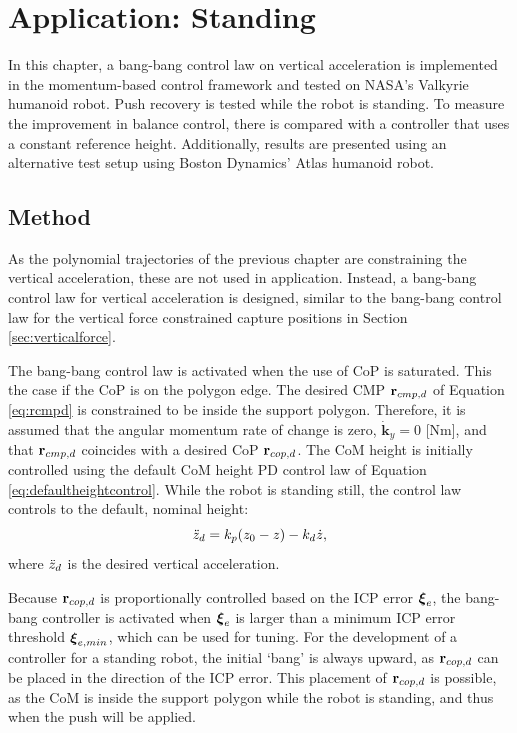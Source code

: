 \chapter{Application: Standing}\label{chap:standing}
In this chapter, a bang-bang control law on vertical acceleration is implemented in the momentum-based control framework and tested on NASA's Valkyrie \cite{radford2015valkyrie} humanoid robot. Push recovery is tested while the robot is standing. To measure the improvement in balance control, there is compared with a controller that uses a constant reference height. Additionally, results are presented using an alternative test setup using Boston Dynamics' Atlas humanoid robot.

\section{Method}
As the polynomial trajectories of the previous chapter are constraining the vertical acceleration, these are not used in application. Instead, a bang-bang control law for vertical acceleration is designed, similar to the bang-bang control law for the vertical force constrained capture positions in Section \ref{sec:verticalforce}.

The bang-bang control law is activated when the use of \ac{CoP} is saturated. This the case if the \ac{CoP} is on the polygon edge. The desired \ac{CMP} $\mathbf{r}_{cmp,d}$ of Equation \eqref{eq:rcmpd} is constrained to be inside the support polygon. Therefore, it is assumed that the angular momentum rate of change is zero, $\dot{\mathbf{k}}_y=0$ [Nm], and that $\mathbf{r}_{cmp,d}$ coincides with a desired \ac{CoP} $\mathbf{r}_{cop,d}$. The \ac{CoM} height is initially controlled using the default \ac{CoM} height PD control law of Equation \eqref{eq:defaultheightcontrol}.  While the robot is standing still, the control law controls to the default, nominal height:
\begin{equation}
\ddot{z}_d =k_p(z_0-z) - k_d\dot{z},
\end{equation}
where $\ddot{z}_d$ is the desired vertical acceleration. 

Because $\mathbf{r}_{cop,d}$ is proportionally controlled based on the \ac{ICP} error $\boldsymbol{\xi}_e$, the bang-bang controller is activated when $\boldsymbol{\xi}_e$ is larger than a minimum \ac{ICP} error threshold $\boldsymbol{\xi}_{e,min}$, which can be used for tuning. For the development of a controller for a standing robot, the initial `bang' is always upward, as $\mathbf{r}_{cop,d}$ can be placed in the direction of the \ac{ICP} error. This placement of $\mathbf{r}_{cop,d}$ is possible, as the \ac{CoM} is inside the support polygon while the robot is standing, and thus when the push will be applied.

